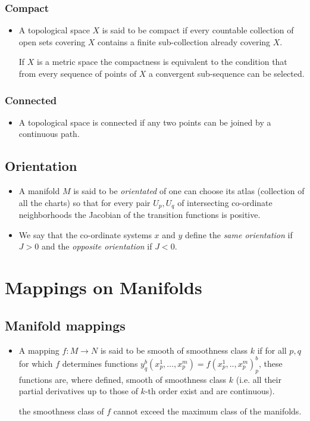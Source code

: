 \documentclass[11pt]{article}
\numberwithin{equation}{section}
\begin{document}
\subsubsection{Compact}
\begin{itemize}
  \item A topological space $X$ is said to be compact if every countable collection of open sets covering $X$ contains a finite sub-collection already covering $X$.

  If $X$ is a metric space the compactness is equivalent to the condition that from every sequence of points of $X$ a convergent sub-sequence can be selected.  
\end{itemize}
\subsubsection{Connected}
\begin{itemize}
  \item A topological space is connected if any two points can be joined by a continuous path. 
\end{itemize}

\subsection{Orientation}
\begin{itemize}
  \item A manifold $M$ is said to be \emph{orientated} of one can choose its atlas (collection of all the charts) so that for every pair $U_{p},U_{q}$ of intersecting co-ordinate neighborhoods the Jacobian of the transition functions is positive.  

  \item We say that the co-ordinate systems $x$ and $y$ define the \emph{same orientation} if $J>0$ and the \emph{opposite orientation} if $J<0$. 
\end{itemize}
\newpage
\section{Mappings on Manifolds}
\subsection{Manifold mappings}
\begin{itemize}
  \item A mapping $f: M \rightarrow N$ is said to be smooth of smoothness class $k$ if for all $p,q$ for which $f$ determines functions $y^{b}_{q}(x^{1}_{p},\ldots,x^{m}_{p}) = f(x^{1}_{p},..,x^m_p)^{b}_{p}$, these functions are, where defined, smooth of smoothness class $k$ (i.e. all their partial derivatives up to those of $k$-th order exist and are continuous).

  the smoothness class of $f$ cannot exceed the maximum class of the manifolds.  
\end{itemize}
\end{document}
